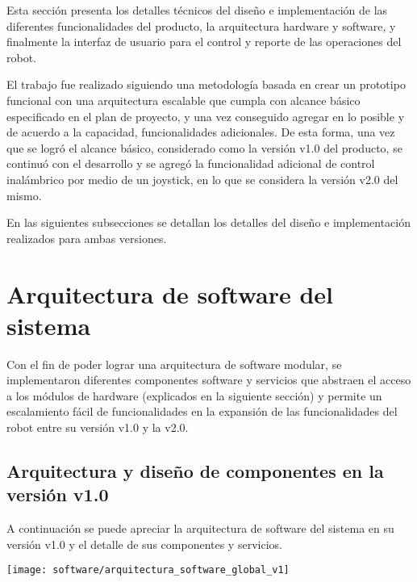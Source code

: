 
Esta sección presenta los detalles técnicos del diseño e implementación de las diferentes funcionalidades del producto, la arquitectura hardware y software, y finalmente la interfaz de usuario para el control y reporte de las operaciones del robot.

El trabajo fue realizado siguiendo una metodología basada en crear un prototipo funcional con una arquitectura escalable que cumpla con alcance básico especificado en el plan de proyecto, y una vez conseguido agregar en lo posible y de acuerdo a la capacidad, funcionalidades adicionales.
De esta forma, una vez que se logró el alcance básico, considerado como la versión v1.0 del producto, se continuó con el desarrollo y se agregó la funcionalidad adicional de control inalámbrico por medio de un joystick, en lo que se considera la versión v2.0 del mismo.

En las siguientes subsecciones se detallan los detalles del diseño e implementación realizados para ambas versiones.


\section{Arquitectura de software del sistema}

Con el fin de poder lograr una arquitectura de software modular, se implementaron diferentes componentes software y servicios que abstraen el acceso a los módulos de hardware (explicados en la siguiente sección) y permite un escalamiento fácil de funcionalidades en la expansión de las funcionalidades del robot entre su versión v1.0 y la v2.0.


\subsection{Arquitectura y diseño de componentes en la versión v1.0}

A continuación se puede apreciar la arquitectura de software del sistema en su versión v1.0 y el detalle de sus componentes y servicios.

\begin{center}
\texttt{[image: software/arquitectura\_software\_global\_v1]}
  \label{fig:arquitectura_software_global}

\end{center}


